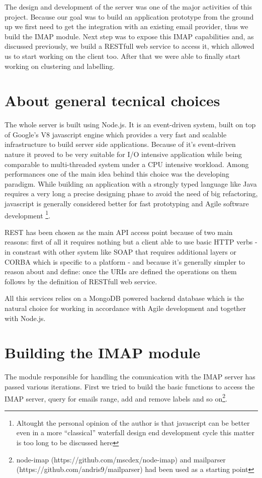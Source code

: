\documentclass[a4paper,12pt]{report}
\begin{document}
The design and development of the server was one of the major activities of this project. Because our goal was to build an application prototype from the ground up we first need to get the integration with an existing email provider, thus we build the IMAP module. Next step was to expose this IMAP capabilities and, as discussed previously, we build a RESTfull web service to access it, which allowed us to start working on the client too. After that we were able to finally start working on clustering and labelling.

\section{About general tecnical choices}
The whole server is built using Node.js. It is an event-driven system, built on top of Google's V8 javascript engine which provides a very fast and scalable infrastructure to build server side applications. Because of it's event-driven nature it proved to be very suitable for I/O intensive application while being comparable to multi-threaded system under a CPU intensive workload. Among performances one of the main idea behind this choice was the developing paradigm. While building an application with a strongly typed language like Java requires a very long a precise designing phase to avoid the need of big refactoring, javascript is generally considered better for fast prototyping and Agile software development \footnote{Altought the personal opinion of the author is that javascript can be better even in a more ``classical'' waterfall design end development cycle this matter is too long to be discussed here}.

REST has been chosen as the main API access point because of two main reasons: first of all it requires nothing but a client able to use basic HTTP verbs - in constrast with other system like SOAP that requires additional layers or CORBA which is specific to a platform - and because it's generally simpler to reason about and define: once the URIs are defined the operations on them follows by the definition of RESTfull web service. 

All this services relies on a MongoDB powered backend database which is the natural choice for working in accordance with Agile development and together with Node.js.

\section{Building the IMAP module}
The module responsible for handling the comunication with the IMAP server has passed various iterations.
First we tried to build the basic functions to access the IMAP server, query for emails range, add and remove labels and so on\footnote{node-imap (https://github.com/mscdex/node-imap) and mailparser (https://github.com/andris9/mailparser) had been used as a starting point}. 
\end{document}
